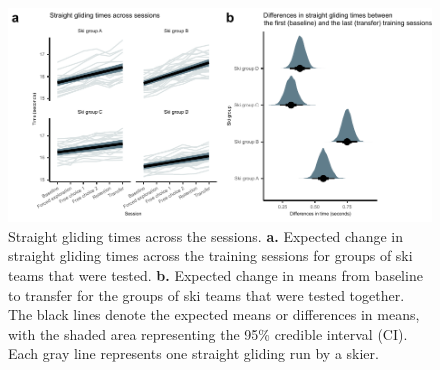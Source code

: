 \begin{figure}
    \centering
    \includegraphics[width=1\linewidth]{figure/figure_methodological_straightgliding.pdf}
    \caption[Straight gliding times across the sessions]{Straight gliding times across the sessions.\textbf{ a.} Expected change in straight gliding times across the training sessions for groups of ski teams that were tested. \textbf{b.} Expected change in means from baseline to transfer for the groups of ski teams that were tested together. The black lines denote the expected means or differences in means, with the shaded area representing the 95\% credible interval (CI). Each gray line represents one straight gliding run by a skier.}
    \label{fig:straightgliding}
\end{figure}


